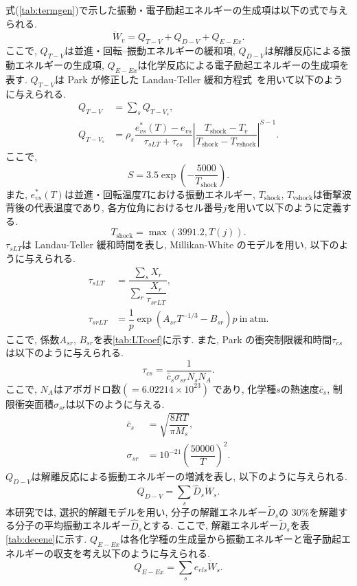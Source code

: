式(\ref{tab:termgen})で示した振動・電子励起エネルギーの生成項は以下の式で与えられる.
\begin{equation}
{\dot W}_v=Q_{T-V}+Q_{D-V}+Q_{E-Ex}.
\end{equation}
ここで,
$Q_{T-V}$は並進・回転--振動エネルギーの緩和項,
$Q_{D-V}$は解離反応による振動エネルギーの生成項,
$Q_{E-Ex}$は化学反応による電子励起エネルギーの生成項を表す.
$Q_{T-V}$は Park が修正した Landau-Teller 緩和方程式~\cite{park1988-landau-teller}を用いて以下のように与えられる.
\begin{align}
Q_{T-V} &=\sum_{s}Q_{{T-V}_s}, \\
Q_{{T-V}_s} &=\rho_{s}\dfrac{e^{\ast}_{vs}(T)-e_{vs}}{\tau_{sLT}+\tau_{cs}} \left| \dfrac{T_\mathrm{shock}-T_{v}}{T_\mathrm{shock}-T_\mathrm{vshock}} \right| ^{S-1}.
\end{align}
ここで,
\begin{equation}
S=3.5\exp \left( -\dfrac{5000}{T_\mathrm{shock}} \right).
\end{equation}
また,
$e^{\ast}_{vs}(T)$は並進・回転温度$T$における振動エネルギー,
$T_\mathrm{shock}$, $T_\mathrm{vshock}$は衝撃波背後の代表温度であり,
各方位角におけるセル番号$j$を用いて以下のように定義する.
\begin{equation}
T_\mathrm{shock}=\max\left(3991.2,T(j)\right).
\end{equation}
$\tau_{sLT}$は Landau-Teller 緩和時間を表し,
Millikan-White のモデル\cite{millikan1963systematics}を用い,
以下のように与えられる.
\begin{align}
  \tau_{sLT} &=\dfrac{\sum_{s}X_r}{\sum_{r}\dfrac{X_r}{\tau_{srLT}}},\\
  \tau_{srLT} &=\dfrac{1}{p}\exp \left( A_{sr}T^{-1/3}-B_{sr} \right) p~\mathrm{in~atm}.
\end{align}
ここで,
係数$A_{sr}$, $B_{sr}$を表\ref{tab:LTcoef}に示す.
また,
Park の衝突制限緩和時間$\tau_{cs}$は以下のように与えられる.
\begin{equation}
  \tau_{cs}=\dfrac{1}{{\bar c}_s \sigma_{sr} N_s N_A}.
\end{equation}
ここで,
$N_A$はアボガドロ数$\left(=6.02214\times10^{23}\right)$
であり,
化学種$s$の熱速度${\bar c}_s$,
制限衝突面積$\sigma_{sr}$は以下のように与える.
\begin{align}
  {\bar c_{s}}&=\sqrt{\dfrac{8RT}{\pi M_{s}}},\\
  \sigma_{sr}&=10^{-21}\left(\dfrac{50000}{T}\right)^2.
\end{align}
$Q_{D-V}$は解離反応による振動エネルギーの増減を表し,
以下のように与えられる.
\begin{equation}
  Q_{D-V}=\sum_{s}\hat{D}_{s}\dot{W}_{s}.
\end{equation}
本研究では,
選択的解離モデルを用い,
分子の解離エネルギー${\tilde D}_{s}$の 30\%を解離する分子の平均振動エネルギー${\hat D}_{s}$とする.
ここで,
解離エネルギー${\tilde D}_{s}$を表\ref{tab:decene}に示す.
$Q_{E-Ex}$は各化学種の生成量から振動エネルギーと電子励起エネルギーの収支を考え以下のように与えられる.
\begin{equation}
  Q_{E-Ex}=\sum_{s}e_{els}{\dot W}_{s}.
\end{equation}

